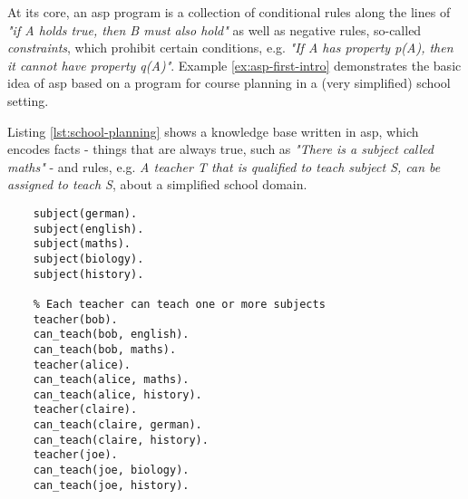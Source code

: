 At its core, an \gls{asp} program is a collection of conditional rules along the lines of \emph{"if A holds true, then B must also hold"} as well as negative rules, so-called \emph{constraints}, which prohibit certain conditions, e.g. \emph{"If A has property p(A), then it cannot have property q(A)"}. Example \ref{ex:asp-first-intro} demonstrates the basic idea of \gls{asp} based on a program for course planning in a (very simplified) school setting.
\begin{example}
\label{ex:asp-first-intro}
Listing \ref{lst:school-planning} shows a knowledge base written in \gls{asp}, which encodes facts - things that are always true, such as \emph{"There is a subject called maths"} - and rules, e.g. \emph{A teacher T that is qualified to teach subject S, can be assigned to teach S}, about a simplified school domain.
\begin{lstlisting}[style=asp-code, caption=School planning in ASP, label={lst:school-planning}]
    % The curriculum consists of different courses.
    subject(german).
    subject(english).
    subject(maths).
    subject(biology).
    subject(history).

    % Each teacher can teach one or more subjects
    teacher(bob).
    can_teach(bob, english).
    can_teach(bob, maths).
    teacher(alice).
    can_teach(alice, maths).
    can_teach(alice, history).
    teacher(claire).
    can_teach(claire, german).
    can_teach(claire, history).
    teacher(joe).
    can_teach(joe, biology).
    can_teach(joe, history).


\end{lstlisting}
\end{example}
